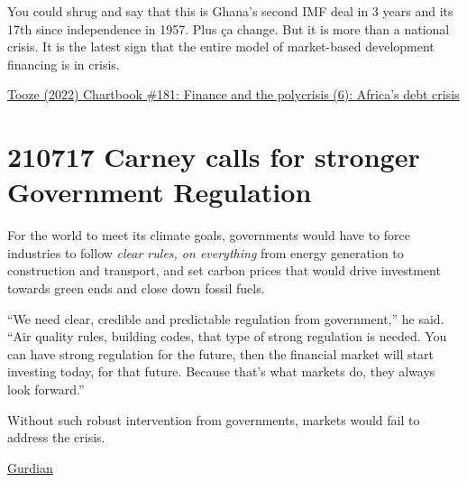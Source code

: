 \documentclass[
]{book}
\begin{document}
You could shrug and say that this is Ghana's second IMF deal in 3 years and its 17th since independence in 1957. Plus ça change. But it is more than a national crisis. It is the latest sign that the entire model of market-based development financing is in crisis.

\href{https://adamtooze.substack.com/p/finance-and-the-polycrisis-6-africas}{Tooze (2022) Chartbook \#181: Finance and the polycrisis (6): Africa's debt crisis}

\hypertarget{carney-calls-for-stronger-government-regulation}{%
\section{210717 Carney calls for stronger Government Regulation}\label{carney-calls-for-stronger-government-regulation}}

For the world to meet its climate goals, governments would have to force industries to follow \emph{clear rules, on everything} from energy generation to construction and transport, and set carbon prices that would drive investment towards green ends and close down fossil fuels.

``We need clear, credible and predictable regulation from government,'' he said. ``Air quality rules, building codes, that type of strong regulation is needed. You can have strong regulation for the future, then the financial market will start investing today, for that future. Because that's what markets do, they always look forward.''

Without such robust intervention from governments, markets would fail to address the crisis.

\href{https://www.theguardian.com/environment/2021/jul/17/regulate-business-to-tackle-climate-crisis-urges-mark-carney}{Gurdian}

  
\end{document}
